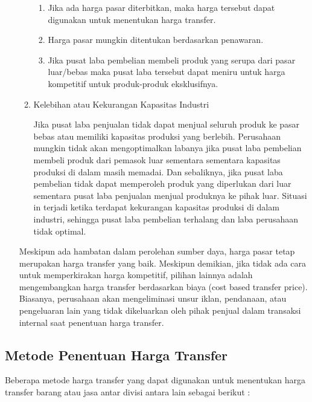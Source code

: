 \begin{enumerate}
\begin{enumerate}
		\begin{enumerate}
			\item Jika ada harga pasar diterbitkan, maka harga tersebut dapat digunakan untuk menentukan harga transfer.
			\item Harga pasar mungkin ditentukan berdasarkan penawaran.
			\item Jika pusat laba pembelian membeli produk yang serupa dari pasar luar/bebas maka pusat laba tersebut dapat meniru untuk harga kompetitif untuk produk-produk eksklusifnya.
		\end{enumerate}

		\item Kelebihan atau Kekurangan Kapasitas Industri
		
		Jika pusat laba penjualan tidak dapat menjual seluruh produk ke pasar bebas atau memiliki kapasitas produksi yang berlebih. Perusahaan mungkin tidak akan mengoptimalkan labanya jika pusat laba pembelian membeli produk dari pemasok luar sementara sementara kapasitas produksi di dalam masih memadai. Dan sebaliknya, jika pusat laba pembelian tidak dapat memperoleh produk yang diperlukan dari luar sementara pusat laba penjualan menjual produknya ke pihak luar. Situasi in terjadi ketika terdapat kekurangan kapasitas produksi di dalam industri, sehingga pusat laba pembelian terhalang dan laba perusahaan tidak optimal.
	\end{enumerate}

	Meskipun ada hambatan dalam perolehan sumber daya, harga pasar tetap merupakan harga transfer yang baik. Meskipun demikian, jika tidak ada cara untuk memperkirakan harga kompetitif, pilihan lainnya adalah mengembangkan harga transfer berdasarkan biaya (cost based transfer price). Biasanya, perusahaan akan mengeliminasi unsur iklan, pendanaan, atau pengeluaran lain yang tidak dikeluarkan oleh pihak penjual dalam transaksi internal saat penentuan harga transfer.

\end{enumerate}

\subsection{Metode Penentuan Harga Transfer}

Beberapa metode harga transfer yang dapat digunakan untuk menentukan harga transfer barang atau jasa antar divisi antara lain sebagai berikut :

